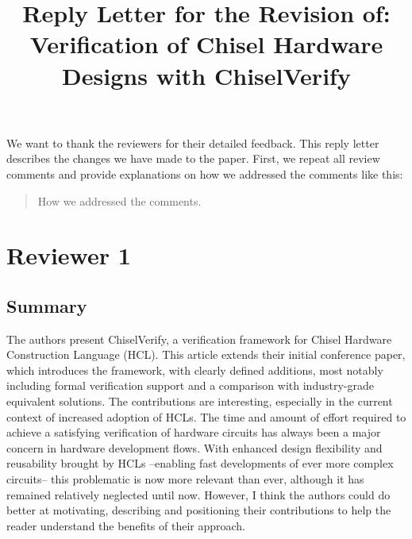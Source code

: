 \documentclass{article}
\newcommand{\reply}[1]{{\color{blue} #1}}
\begin{document}

\title{Reply Letter for the Revision of:\\[2ex]Verification of Chisel Hardware Designs with ChiselVerify}


\maketitle \thispagestyle{empty}


We want to thank the reviewers for their detailed feedback.
This reply letter describes the changes we have made to the paper.
First, we repeat all review comments and provide explanations on how we addressed the comments like this:

\begin{quote}
\reply{How we addressed the comments.}
\end{quote}




\section*{Reviewer 1}



\subsection*{Summary}
The authors present ChiselVerify, a verification framework for Chisel Hardware Construction Language (HCL).
This article extends their initial conference paper, which introduces the framework, with clearly defined additions, most notably including formal verification support and a comparison with industry-grade equivalent solutions.
The contributions are interesting, especially in the current context of increased adoption of HCLs.
The time and amount of effort required to achieve a satisfying verification of hardware circuits has always been a major concern in hardware development flows.
With enhanced design flexibility and reusability brought by HCLs --enabling fast developments of ever more complex circuits-- this problematic is now more relevant than ever, although it has remained relatively neglected until now.
However, I think the authors could do better at motivating, describing and positioning their contributions to help the reader understand the benefits of their approach.
\end{document}
